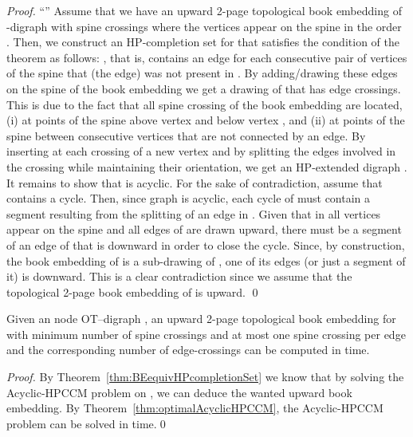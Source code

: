 \documentclass{myllncs-mixalis}
\begin{document}
\begin{proof}
``'' Assume that we have an upward 2-page
topological book embedding of -digraph  with  spine
crossings where the vertices appear on the spine in the order
. Then, we construct an
HP-completion set  for  that satisfies the condition of the
theorem as follows: , that is,  contains
an edge for each consecutive pair of vertices of the spine that (the
edge) was not present in . By adding/drawing these edges on the
spine of the book embedding we get a drawing   of
 that has  edge crossings. This is due
to the fact that all spine crossing of the book embedding are
located, (i) at points of the spine above vertex  and below
vertex , and (ii) at points of the spine between consecutive
vertices that are not connected by an edge. By inserting at  each
crossing of   a new vertex and by splitting the
edges involved in the crossing while maintaining their orientation,
we get an HP-extended digraph . It remains to show that 
is acyclic. For the sake of contradiction, assume that 
contains a cycle. Then, since graph  is acyclic, each cycle of
 must contain a segment resulting from the splitting of an edge
in . Given that in  all vertices appear on
the spine and all edges of  are drawn upward, there must be a
segment of an edge of  that is downward in order to close the
cycle. Since, by construction, the book embedding of  is a
sub-drawing of ,  one of its edges (or just a
segment of it) is downward. This is a clear contradiction since we
assume that the topological 2-page book embedding of  is upward.
\qed
\end{proof}


\begin{theorem}
\label{thm:optimalAcyclicHPCCM} Given an   node OT--digraph
, an upward 2-page topological book embedding for  with
minimum number of spine crossings and at most one spine crossing per
edge and the corresponding number of edge-crossings can be computed
in  time.
\end{theorem}

\begin{proof}
By Theorem~\ref{thm:BEequivHPcompletionSet} we know that by solving
the Acyclic-HPCCM problem on , we can deduce the wanted upward
book embedding. By Theorem~\ref{thm:optimalAcyclicHPCCM}, the
Acyclic-HPCCM problem can be solved in  time.\qed
\end{proof}






\newpage
\end{document}

